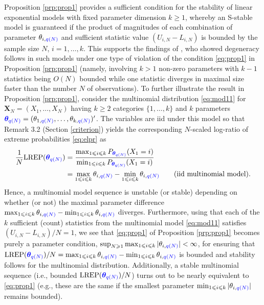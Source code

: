 \documentclass[numbib]{imamat}
\theoremstyle{theorem}
\theoremstyle{lemma}
\theoremstyle{example}
\theoremstyle{corollary}
\theoremstyle{definition}
\theoremstyle{remark}
\theoremstyle{approximation}
\theoremstyle{scheme}
\newcommand{\REP}{\mathrm{LREP}}
\newcommand{\thetaidx}{q(N)}
\newcommand{\thetaN}{\boldsymbol \theta_{\thetaidx}}
\newcommand{\ak}[1]{{\color{blue} #1}}
\begin{document}
Proposition \ref{prp:prop1} provides a sufficient condition for the stability of linear exponential models with fixed parameter dimension \(k\geq 1\), whereby an S-stable model is guaranteed if the \ak{product of magnitudes} of each combination of parameter \(\theta_{i,\ak{\thetaidx}}\) and sufficient statistic value \((U_{i,N}-L_{i,N})\) is bounded by the sample size \(N\), \(i=1,\ldots,k\). This supports the findings of \citet{schweinberger2011instability}, who showed degeneracy follows in such models under one type of violation of the condition \eqref{eq:prop1} in Proposition \ref{prp:prop1} (namely, involving \(k>1\) non-zero parameters with \(k-1\) statistics being \(O(N)\) bounded while one statistic diverges in maximal size faster than the number \(N\) of observations). To further illustrate the result in Proposition \ref{prp:prop1}, consider the multinomial distribution \eqref{eq:mod11} for \(\boldsymbol X_N=(X_1,\ldots,X_N)\) having \(k\geq 2\) categories \(\{1,\ldots,k\}\) and \(k\) parameters \(\ak{\thetaN} = (\theta_{1,\ak{\thetaidx}},\ldots,\theta_{k,\ak{\thetaidx}})^\prime\). The variables are iid under this model so that \ak{Remark 3.2} (Section \ref{criterion}) yields the corresponding \(N\)-scaled log-ratio of extreme probabilities \eqref{eq:elpr} as
\begin{align*}
  \frac{1}{N}\REP(\ak{\thetaN}) &= \frac{\max_{1 \leq i \leq k} P_{\ak{\thetaN}}(X_1=i)}{\min_{1 \leq i \leq k} P_{\ak{\thetaN}}(X_1=i)}\\
  &= \max_{1 \leq i \leq k} \theta_{i,\ak{\thetaidx}} - \min_{1 \leq i \leq k} \theta_{i,\ak{\thetaidx}} \qquad \text{(iid multinomial model)}.
\end{align*}
Hence, a multinomial model sequence is unstable (or stable) depending on whether (or not) the maximal parameter difference \(\max_{1 \leq i \leq k} \theta_{i,\ak{\thetaidx}} - \min_{1 \leq i \leq k} \theta_{i,\ak{\thetaidx}}\) diverges. Furthermore, using that each of the \(k\) sufficient (count) statistics from the multinomial model \eqref{eq:mod11} satisfies \((U_{i,N}-L_{i,N})/N=1\), we see that \eqref{eq:prop1} of Proposition \ref{prp:prop1} becomes purely a parameter condition, \(\sup_{N \geq 1}\max_{1 \leq i \leq k } |\theta_{i,\ak{\thetaidx}}| <\infty\), for ensuring that \(\REP(\ak{\thetaN})/N =\max_{1 \leq i \leq k} \theta_{i,\ak{\thetaidx}} - \min_{1 \leq i \leq k} \theta_{i,\ak{\thetaidx}}\) is bounded and stability follows for the multinomial distribution. Additionally, a stable multinomial sequence (i.e., bounded \(\REP(\ak{\thetaN})/N\)) turns out to be nearly equivalent to \eqref{eq:prop1} (e.g., these are the same if the smallest parameter \(\min_{1 \leq i \leq k } |\theta_{i,\ak{\thetaidx}}|\) remains bounded).
\end{document}
